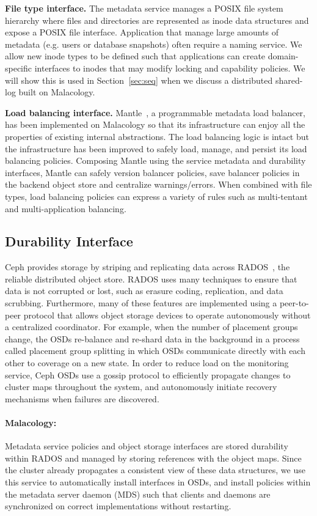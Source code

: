 \documentclass[preprint]{sigplanconf-eurosys}
\begin{document}
{\bf File type interface.} The metadata service manages a POSIX file system
hierarchy where files and directories are represented as inode data structures
and expose a POSIX file interface. Application that manage large amounts of
metadata (e.g. users or database snapshots) often require a naming service. We
allow new inode types to be defined such that applications can create
domain-specific interfaces to inodes that may modify locking and capability
policies. We will show this is used in Section~\ref{sec:seq} when we discuss a
distributed shared-log built on Malacology.

{\bf Load balancing interface.} Mantle~\cite{sevilla:sc15-mantle}, a
programmable metadata load balancer, has been implemented on Malacology so that
its infrastructure can enjoy all the properties of existing internal
abstractions.  The load balancing logic is intact but the infrastructure has
been improved to safely load, manage, and persist its load balancing policies.
Composing Mantle using the service metadata and durability interfaces, Mantle
can safely version balancer policies, save balancer policies in the backend
object store and centralize warnings/errors. When combined with file types,
load balancing policies can express a variety of rules such as multi-tentant
and multi-application balancing.

\subsection{Durability Interface}
\label{sec:durability}

Ceph provides storage by striping and replicating data across
RADOS~\cite{weil_rados_2007}, the reliable distributed object store. RADOS uses
many techniques to ensure that data is not corrupted or lost, such as erasure
coding, replication, and data scrubbing.  Furthermore, many of these features
are implemented using a peer-to-peer protocol that allows object storage
devices to operate autonomously without a centralized coordinator.  For
example, when the number of placement groups change, the OSDs re-balance and
re-shard data in the background in a process called placement group splitting
in which OSDs communicate directly with each other to coverage on a new state.
In order to reduce load on the monitoring service, Ceph OSDs use a gossip
protocol to efficiently propagate changes to cluster maps throughout the
system, and autonomously initiate recovery mechanisms when failures are
discovered.

\paragraph*{Malacology:} Metadata service policies and object storage
interfaces are stored durability within RADOS and managed by storing references
with the object maps. Since the cluster already propagates a consistent view of
these data structures, we use this service to automatically install interfaces
in OSDs, and install policies within the metadata server daemon (MDS) such that clients and daemons are
synchronized on correct implementations without restarting.
\end{document}
